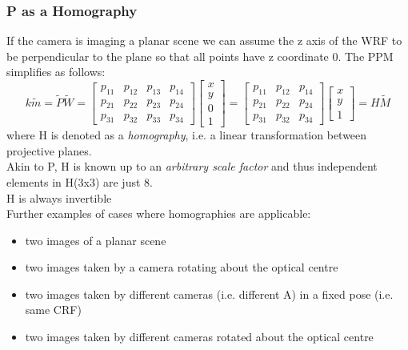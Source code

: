 \documentclass{article}
\begin{document}
\subsubsection{P as a Homography}
If the camera is imaging a planar scene we can assume the z axis of the WRF to be perpendicular to the plane so that all points have z coordinate 0. The PPM simplifies as follows:
\begin{equation}
    k\tilde{m}=\tilde{P}\tilde{W}=\begin{bmatrix}
        p_{11} & p_{12} & p_{13} & p_{14} \\
        p_{21} & p_{22} & p_{23} & p_{24} \\
        p_{31} & p_{32} & p_{33} & p_{34} 
    \end{bmatrix} \begin{bmatrix}
        x\\
        y\\
        0\\
        1
    \end{bmatrix}=\begin{bmatrix}
        p_{11} & p_{12} & p_{14} \\
        p_{21} & p_{22} & p_{24} \\
        p_{31} & p_{32} & p_{34}
    \end{bmatrix} \begin{bmatrix}
        x\\
        y\\
        1
    \end{bmatrix}=H\tilde{M}
\end{equation}
where H is denoted as a \emph{homography}, i.e. a linear transformation between projective planes.\\
Akin to P, H is known up to an \emph{arbitrary scale factor} and thus independent elements in H(3x3) are just 8.\\
H is always invertible\\
Further examples of cases where homographies are applicable:
\begin{itemize}
    \item two images of a planar scene
    \item two images taken by a camera rotating about the optical centre
    \item two images taken by different cameras (i.e. different A) in a fixed pose (i.e. same CRF)
    \item two images taken by different cameras rotated about the optical centre
\end{itemize}
\end{document}
